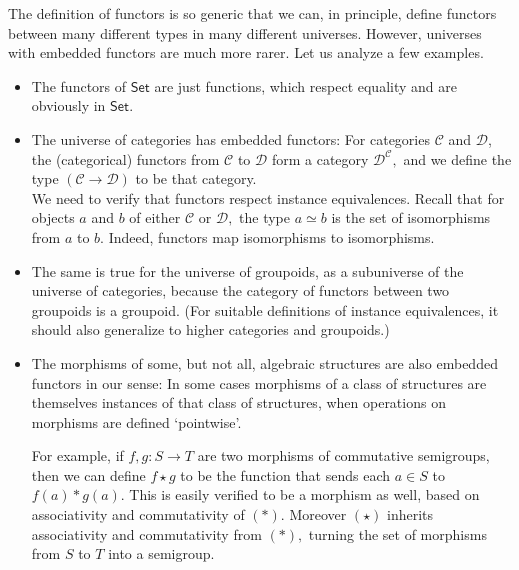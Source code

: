 \documentclass[a4paper]{article}
\theoremstyle{definition}
\theoremstyle{remark}
\renewcommand{\equiv}{\simeq}
\newcommand{\C}{\mathcal{C}}
\newcommand{\D}{\mathcal{D}}
\newcommand{\nm}{\mathsf}
\newcommand{\universe}{\nm}
\newcommand{\Set}{\universe{Set}}
\begin{document}
The definition of functors is so generic that we can, in principle, define functors between
many different types in many different universes. However, universes with embedded functors
are much more rarer. Let us analyze a few examples.
\begin{itemize}
  \item The functors of $\Set$ are just functions, which respect equality and are obviously
  in $\Set$.
  \item The universe of categories has embedded functors: For categories $\C$ and $\D$, the
  (categorical) functors from $\C$ to $\D$ form a category $\D^\C,$ and we define the type
  $(\C \to \D)$ to be that category.\\
  We need to verify that functors respect instance equivalences. Recall that for objects
  $a$ and $b$ of either $\C$ or $\D,$ the type $a \equiv b$ is the set of isomorphisms from
  $a$ to $b.$ Indeed, functors map isomorphisms to isomorphisms.
  \item The same is true for the universe of groupoids, as a subuniverse of the universe of
  categories, because the category of functors between two groupoids is a groupoid. (For
  suitable definitions of instance equivalences, it should also generalize to higher
  categories and groupoids.)
  \item The morphisms of some, but not all, algebraic structures are also embedded functors
  in our sense: In some cases morphisms of a class of structures are themselves instances
  of that class of structures, when operations on morphisms are defined `pointwise'.

  For example, if $f,g : S \to T$ are two morphisms of commutative semigroups, then we can
  define $f \star g$ to be the function that sends each $a \in S$ to $f(a) \ast g(a).$ This
  is easily verified to be a morphism as well, based on associativity and commutativity
  of $(\ast).$ Moreover $(\star)$ inherits associativity and commutativity from $(\ast),$
  turning the set of morphisms from $S$ to $T$ into a semigroup.


\end{itemize}
\end{document}
